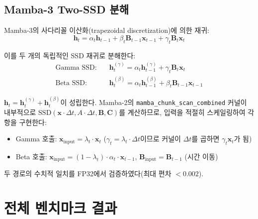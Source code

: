 \documentclass[11pt]{article}
\begin{document}
\subsection{Mamba-3 Two-SSD 분해}

Mamba-3의 사다리꼴 이산화(trapezoidal discretization)에 의한 재귀:
\begin{equation}
\mathbf{h}_t = \alpha_t \mathbf{h}_{t-1} + \beta_t \mathbf{B}_{t-1} \mathbf{x}_{t-1} + \gamma_t \mathbf{B}_t \mathbf{x}_t
\end{equation}

이를 두 개의 독립적인 SSD 재귀로 분해한다:
\begin{align}
\text{Gamma SSD:} \quad &\mathbf{h}_t^{(\gamma)} = \alpha_t \mathbf{h}_{t-1}^{(\gamma)} + \gamma_t \mathbf{B}_t \mathbf{x}_t \\
\text{Beta SSD:} \quad &\mathbf{h}_t^{(\beta)} = \alpha_t \mathbf{h}_{t-1}^{(\beta)} + \beta_t \mathbf{B}_{t-1} \mathbf{x}_{t-1}
\end{align}

$\mathbf{h}_t = \mathbf{h}_t^{(\gamma)} + \mathbf{h}_t^{(\beta)}$이 성립한다. Mamba-2의 \texttt{mamba\_chunk\_scan\_combined} 커널이 내부적으로 $\text{SSD}(\mathbf{x} \cdot \Delta t, A \cdot \Delta t, \mathbf{B}, \mathbf{C})$를 계산하므로, 입력을 적절히 스케일링하여 각 항을 구현한다:

\begin{itemize}[leftmargin=*]
\item Gamma 호출: $\mathbf{x}_{\text{input}} = \lambda_t \cdot \mathbf{x}_t$ ($\gamma_t = \lambda_t \cdot \Delta t$이므로 커널이 $\Delta t$를 곱하면 $\gamma_t \mathbf{x}_t$가 됨)
\item Beta 호출: $\mathbf{x}_{\text{input}} = (1 - \lambda_t) \cdot \alpha_t \cdot \mathbf{x}_{t-1}$, $\mathbf{B}_{\text{input}} = \mathbf{B}_{t-1}$ (시간 이동)
\end{itemize}

두 경로의 수치적 일치를 FP32에서 검증하였다(최대 편차 $< 0.002$).

\section{전체 벤치마크 결과}
\end{document}
